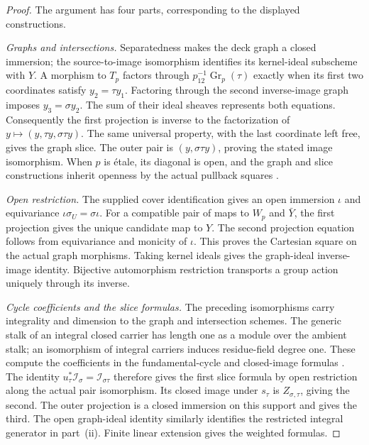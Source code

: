 \documentclass[11pt]{article}
\theoremstyle{definition}
\theoremstyle{remark}
\begin{document}
\begin{proof}
The argument has four parts, corresponding to the displayed constructions.

\emph{Graphs and intersections.}
Separatedness makes the deck graph a closed immersion; the
source-to-image isomorphism identifies its kernel-ideal subscheme
with \(Y\). A morphism to \(T_p\) factors through
\(p_{12}^{-1}\operatorname{Gr}_p(\tau)\) exactly when its first two
coordinates satisfy \(y_2=\tau y_1\). Factoring through the second
inverse-image graph imposes \(y_3=\sigma y_2\).
The sum of their ideal sheaves represents both equations.
Consequently the first projection is inverse to the factorization of
\(y\mapsto(y,\tau y,\sigma\tau y)\). The same universal property,
with the last coordinate left free, gives the graph slice.
The outer pair is \((y,\sigma\tau y)\), proving the stated image
isomorphism. When \(p\) is \'etale, its diagonal is open, and the
graph and slice constructions inherit openness by the actual
pullback squares \cite{StacksUnramifiedSections}.

\emph{Open restriction.}
The supplied cover identification gives an open immersion \(\iota\)
and equivariance
\(\iota\sigma_U=\sigma\iota\).
For a compatible pair of maps to \(W_p\) and \(\bar Y\), the first
projection gives the unique candidate map to \(Y\).
The second projection equation follows from equivariance and
monicity of \(\iota\). This proves the Cartesian square on the
actual graph morphisms. Taking kernel ideals gives the graph-ideal
inverse-image identity. Bijective automorphism restriction transports
a group action uniquely through its inverse.

\emph{Cycle coefficients and the slice formulas.}
The preceding isomorphisms carry integrality and dimension to the
graph and intersection schemes. The generic stalk of an integral closed carrier has length one as
a module over the ambient stalk;
an isomorphism of integral carriers induces residue-field degree
one. These compute the coefficients in the fundamental-cycle
and closed-image formulas
\cite{StacksFundamentalCycle,StacksProperCyclePushforward}.
The identity
\(u_\tau^*\mathcal I_\sigma=\mathcal I_{\sigma\tau}\)
therefore gives the first slice formula by open restriction along
the actual pair isomorphism. Its closed image under \(s_\tau\)
is \(Z_{\sigma,\tau}\), giving the second. The outer projection
is a closed immersion on this support and gives the third.
The open graph-ideal identity similarly identifies the restricted
integral generator in part~(ii). Finite linear extension gives the
weighted formulas.


\end{proof}
\end{document}
